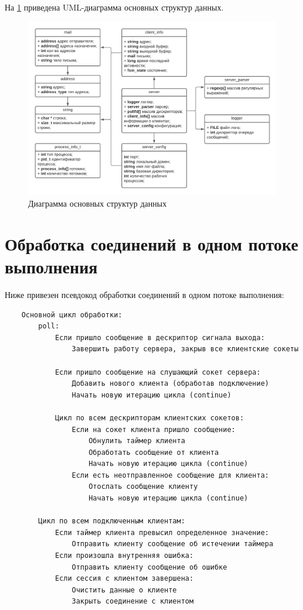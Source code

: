 \documentclass[a4paper,12pt]{report}
\begin{document}
На \ref{fig:uml} приведена UML-диаграмма основных структур данных.

\begin{figure}[H]
	\centering
	\includegraphics[width=\textwidth]{include/uml.pdf}
	\caption{Диаграмма основных структур данных}
	\label{fig:uml}
\end{figure}

\section{Обработка соединений в одном потоке выполнения}

Ниже привезен псевдокод обработки соединений в одном потоке выполнения: 
\begin{lstlisting}
	Основной цикл обработки:
		poll:
			Если пришло сообщение в дескриптор сигнала выхода:
				Завершить работу сервера, закрыв все клиентские сокеты
	
			Если пришло сообщение на слушающий сокет сервера:
				Добавить нового клиента (обработав подключение)
				Начать новую итерацию цикла (continue)
	
			Цикл по всем дескрипторам клиентских сокетов:
				Если на сокет клиента пришло сообщение:
					Обнулить таймер клиента
					Обработать сообщение от клиента
					Начать новую итерацию цикла (continue)
				Если есть неотправленное сообщение для клиента: 
					Отослать сообщение клиенту
					Начать новую итерацию цикла (continue)	
					
		Цикл по всем подключенным клиентам:
			Если таймер клиента превысил определенное значение:
				Отправить клиенту сообщение об истечении таймера
			Eсли произошла внутренняя ошибка: 
				Отправить клиенту сообщение об ошибке
			Если сессия с клиентом завершена:
				Очистить данные о клиенте
				Закрыть соединение с клиентом
\end{lstlisting}
\end{document}
